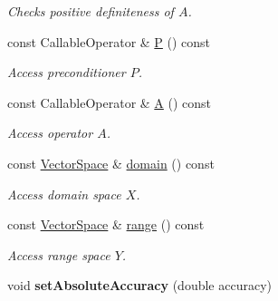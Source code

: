 \begin{DoxyCompactItemize}
\begin{DoxyCompactList}\small\item\em Checks positive definiteness of $A$. \end{DoxyCompactList}\item 
\hypertarget{classSpacy_1_1CG_1_1LinearSolver_aeb4edca3af6d08fcb7700664c2058512}{}const Callable\+Operator \& \hyperlink{classSpacy_1_1CG_1_1LinearSolver_aeb4edca3af6d08fcb7700664c2058512}{P} () const \label{classSpacy_1_1CG_1_1LinearSolver_aeb4edca3af6d08fcb7700664c2058512}

\begin{DoxyCompactList}\small\item\em Access preconditioner $P$. \end{DoxyCompactList}\item 
\hypertarget{classSpacy_1_1CG_1_1LinearSolver_aed4f6379ad3972bd765830ea57e05135}{}const Callable\+Operator \& \hyperlink{classSpacy_1_1CG_1_1LinearSolver_aed4f6379ad3972bd765830ea57e05135}{A} () const \label{classSpacy_1_1CG_1_1LinearSolver_aed4f6379ad3972bd765830ea57e05135}

\begin{DoxyCompactList}\small\item\em Access operator $A$. \end{DoxyCompactList}\item 
\hypertarget{classSpacy_1_1OperatorBase_a2588f9b3e0188820c4c494e63293dc6f}{}const \hyperlink{classSpacy_1_1VectorSpace}{Vector\+Space} \& \hyperlink{classSpacy_1_1OperatorBase_a2588f9b3e0188820c4c494e63293dc6f}{domain} () const \label{classSpacy_1_1OperatorBase_a2588f9b3e0188820c4c494e63293dc6f}

\begin{DoxyCompactList}\small\item\em Access domain space $X$. \end{DoxyCompactList}\item 
\hypertarget{classSpacy_1_1OperatorBase_ab19d3b7a6f290b1079248f1e567e53d6}{}const \hyperlink{classSpacy_1_1VectorSpace}{Vector\+Space} \& \hyperlink{classSpacy_1_1OperatorBase_ab19d3b7a6f290b1079248f1e567e53d6}{range} () const \label{classSpacy_1_1OperatorBase_ab19d3b7a6f290b1079248f1e567e53d6}

\begin{DoxyCompactList}\small\item\em Access range space $Y$. \end{DoxyCompactList}\item 
\hypertarget{classSpacy_1_1Mixin_1_1AbsoluteAccuracy_a71cfcdc0c504be63c18c3e78df157738}{}void {\bfseries set\+Absolute\+Accuracy} (double accuracy)\label{classSpacy_1_1Mixin_1_1AbsoluteAccuracy_a71cfcdc0c504be63c18c3e78df157738}


\end{DoxyCompactItemize}
